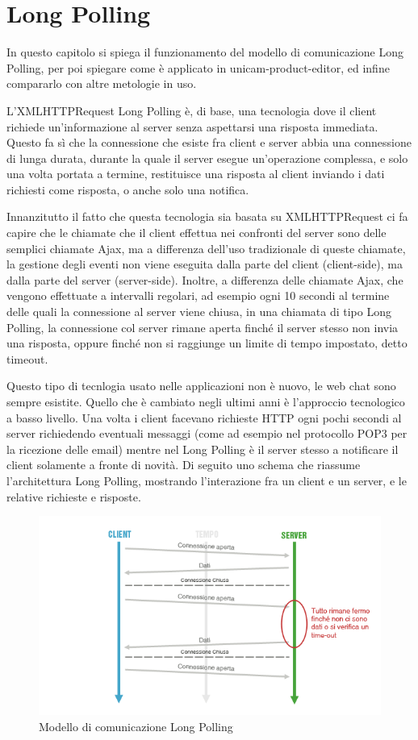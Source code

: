 \chapter{Long Polling}
In questo capitolo si spiega il funzionamento del modello di comunicazione Long Polling, per poi spiegare come è applicato in unicam-product-editor, ed infine compararlo con altre metologie in uso.

L'XMLHTTPRequest Long Polling è, di base, una tecnologia dove il client richiede un'informazione al server senza aspettarsi una risposta immediata.
Questo fa sì che la connessione che esiste fra client e server abbia una connessione di lunga durata, durante la quale il server esegue un'operazione complessa, e solo una volta portata a termine, restituisce una risposta al client inviando i dati richiesti come risposta, o anche solo una notifica.

Innanzitutto il fatto che questa tecnologia sia basata su XMLHTTPRequest ci fa capire che le chiamate che il client effettua nei confronti del server sono delle semplici chiamate Ajax, ma a differenza dell'uso tradizionale di queste chiamate, la gestione degli eventi non viene eseguita dalla parte del client (client-side), ma dalla parte del server (server-side).
Inoltre, a differenza delle chiamate Ajax, che vengono effettuate a intervalli regolari, ad esempio ogni 10 secondi al termine delle quali la connessione al server viene chiusa, in una chiamata di tipo Long Polling, la connessione col server rimane aperta finché il server stesso non invia una risposta, oppure finché non si raggiunge un limite di tempo impostato, detto timeout.

Questo tipo di tecnlogia usato nelle applicazioni non è nuovo, le web chat sono sempre esistite. Quello che è cambiato negli ultimi anni è l’approccio tecnologico a basso livello. Una volta i client facevano richieste HTTP ogni pochi secondi al server richiedendo eventuali messaggi (come ad esempio nel protocollo POP3 per la ricezione delle email) mentre nel Long Polling è il server stesso a notificare il client solamente a fronte di novità.
\newpage
Di seguito uno schema che riassume l'architettura Long Polling, mostrando l'interazione fra un client e un server, e le relative richieste e risposte.
\begin{figure}[h]
	\centering
	\includegraphics[scale=0.7]{Immagini/long_polling.png}
	\caption{Modello di comunicazione Long Polling}
\end{figure}

